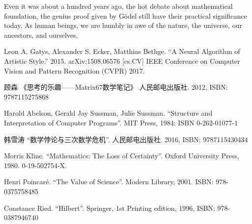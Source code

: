 \documentclass{article}
\begin{document}
Even it was about a hundred years ago, the hot debate about mathematical foundation, the genius proof given by Gödel still have their practical significance today. As human beings, we are humbly in awe of the nature, the universe, our ancestors, and ourselves.

\ifx\wholebook\relax \else
\begin{thebibliography}{99}

Leon A. Gatys, Alexander S. Ecker, Matthias Bethge. ``A Neural Algorithm of Artistic Style.'' 2015. arXiv:1508.06576 [cs.CV] IEEE Conference on Computer Vision and Pattern Recognition (CVPR) 2017.

{\fontspec{\cnmainft}顾森 《思考的乐趣——Matrix67数学笔记》 人民邮电出版社.} 2012, ISBN: 9787115275868

Harold Abelson, Gerald Jay Sussman, Julie Sussman. ``Structure and Interpretation of Computer Programs''. MIT Press, 1984; ISBN 0-262-01077-1

{\fontspec{\cnmainft}韩雪涛 ``数学悖论与三次数学危机''. 人民邮电出版社}. 2016, ISBN: 9787115430434

Morris Kline. ``Mathematics: The Loss of Certainty''. Oxford University Press, 1980. 0-19-502754-X.

Henri Poincaré. ``The Value of Science''. Modern Library, 2001. ISBN: 978-0375758485

Constance Ried. ``Hilbert''. Springer, 1st Printing edition, 1996, ISBN: 978-0387946740

\end{thebibliography}

\expandafter\enddocument

\fi
\end{document}
